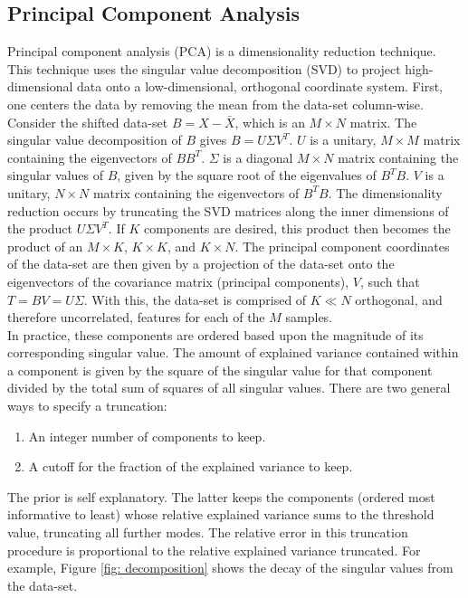 \documentclass[paper=a4, fontsize=11pt]{scrartcl} %
\begin{document}
\subsection*{Principal Component Analysis}
Principal component analysis (PCA) is a dimensionality reduction technique.
This technique uses the singular value decomposition (SVD) to project high-dimensional data onto a low-dimensional, orthogonal coordinate system.
First, one centers the data by removing the mean from the data-set column-wise.
Consider the shifted data-set $B = X - \bar{X}$, which is an $M \times N$ matrix.
The singular value decomposition of $B$ gives $B = U \Sigma V^T$.
$U$ is a unitary, $M \times M$ matrix containing the eigenvectors of $B B^T$.
$\Sigma$ is a diagonal $M \times N$ matrix containing the singular values of $B$, given by the square root of the eigenvalues of $B^T B$.
$V$ is a unitary, $N \times N$ matrix containing the eigenvectors of $B^T B$.
The dimensionality reduction occurs by truncating the SVD matrices along the inner dimensions of the product $U \Sigma V^T$.
If $K$ components are desired, this product then becomes the product of an $M \times K$, $K \times K$, and $K \times N$.
The principal component coordinates of the data-set are then given by a projection of the data-set onto the eigenvectors of the covariance matrix (principal components), $V$, such that $T = B V = U \Sigma$.
With this, the data-set is comprised of $K \ll N $ orthogonal, and therefore uncorrelated, features for each of the $M$ samples.
\\
In practice, these components are ordered based upon the magnitude of its corresponding singular value.
The amount of explained variance contained within a component is given by the square of the singular value for that component divided by the total sum of squares of all singular values.
There are two general ways to specify a truncation:
\begin{enumerate}
	\item An integer number of components to keep.
	\item A cutoff for the fraction of the explained variance to keep.
\end{enumerate}
The prior is self explanatory.
The latter keeps the components (ordered most informative to least) whose relative explained variance sums to the threshold value, truncating all further modes.
The relative error in this truncation procedure is proportional to the relative explained variance truncated.
For example, Figure \ref{fig: decomposition} shows the decay of the singular values from the data-set.
\end{document}
